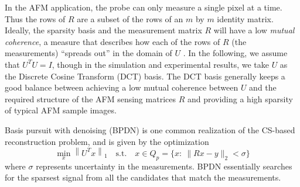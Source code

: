 \documentclass[twocolumn,oneside]{IEEEtran/IEEEtran}
\begin{document}
	
In the AFM application, the probe can only measure a single pixel at a time.
Thus the rows of $R$ are a subset of the rows of an $m$ by $m$ identity matrix.
Ideally, the sparsity basis and
the measurement matrix $R$ will have a low \textit{mutual coherence}, a
measure that describes how each of the rows of $R$ (the measurements)
``spreads out'' in the domain of $U$ \cite{candes2007sparsity}.
In the following, we assume that $U^TU=I$, though in the simulation and
experimental results, we take $U$ as the Discrete Cosine Transform (DCT) basis.
The DCT basis generally keeps a good balance between achieving a low
mutual coherence between $U$ and the required structure of the AFM sensing
matrices $R$ and providing a high sparsity of typical AFM sample images. 
	
Basis pursuit with denoising (BPDN) is one common realization of the CS-based
reconstruction problem, and is given by the optimization
\begin{equation}
  \min_{x} \left \| U^Tx \right \|_1 \quad
  \text{s.t.}\quad x\in Q_p = \{x:~\|Rx - y\|_2 < \sigma\} \label{op:bp}
\end{equation}
where $\sigma$ represents uncertainty in the measurements. BPDN
essentially searches for the sparsest signal from all
the candidates that match the measurements.
\end{document}
